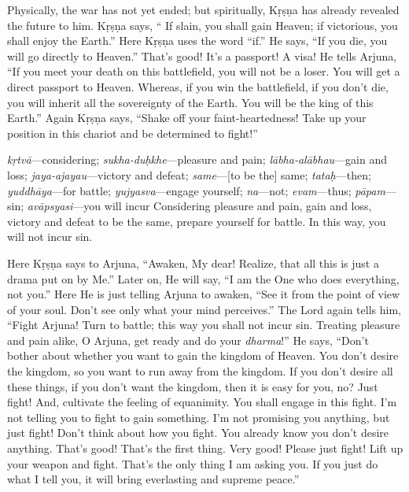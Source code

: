 Physically, the war has not yet ended; but spiritually, Kṛṣṇa has already revealed the future to him. Kṛṣṇa says, “ If slain, you shall gain Heaven; if victorious, you shall enjoy the Earth.” Here Kṛṣṇa uses the word “if.” He says, “If you die, you will go directly to Heaven.” That’s good! It’s a passport! A visa! He tells Arjuna, “If you meet your death on this battlefield, you will not be a loser. You will get a direct passport to Heaven. Whereas, if you win the battlefield, if you don’t die, you will inherit all the sovereignty of the Earth. You will be the king of this Earth.” Again Kṛṣṇa says, “Shake off your faint-heartedness! Take up your position in this chariot and be determined to fight!”

{%
  \textit{kṛtvā}---considering; 
  \textit{sukha-duḥkhe}---pleasure and pain; 
  \textit{lābha-alābhau}---gain and loss; 
  \textit{jaya-ajayau}---victory and defeat; 
  \textit{same}---[to be the] same; 
  \textit{tataḥ}---then; 
  \textit{yuddhāya}---for battle; 
  \textit{yujyasva}---engage yourself; 
  \textit{na}---not; 
  \textit{evam}---thus; 
  \textit{pāpam}---sin; 
  \textit{avāpsyasi}---you will incur
}
{%
  Considering pleasure and pain, gain and loss, victory and defeat to be the same, prepare yourself for battle. In this way, you will not incur sin.
}

Here Kṛṣṇa says to Arjuna, “Awaken, My dear! Realize, that all this is just a drama put on by Me.” Later on, He will say, “I am the One who does everything, not you.” Here He is just telling Arjuna to awaken, “See it from the point of view of your soul. Don’t see only what your mind perceives.” The Lord again tells him, “Fight Arjuna! Turn to battle; this way you shall not incur sin. Treating pleasure and pain alike, O Arjuna, get ready and do your \textit{dharma}!” He says, “Don’t bother about whether you want to gain the kingdom of Heaven. You don’t desire the kingdom, so you want to run away from the kingdom. If you don’t desire all these things, if you don’t want the kingdom, then it is easy for you, no? Just fight! And, cultivate the feeling of equanimity. You shall engage in this fight. I’m not telling you to fight to gain something. I’m not promising you anything, but just fight! Don’t think about how you fight. You already know you don’t desire anything. That’s good! That’s the first thing. Very good! Please just fight! Lift up your weapon and fight. That’s the only thing I am asking you. If you just do what I tell you, it will bring everlasting and supreme peace.”

